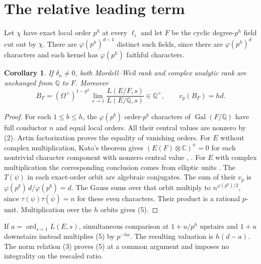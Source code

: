 \documentclass[11pt]{article}
\newtheorem{corollary}[theorem]{Corollary}
\newcommand{\Q}{\mathbb Q}
\newcommand{\ord}{\operatorname{ord}}
\begin{document}
\section{The relative leading term}
Let $\chi$ have exact local order $p^h$ at every $\ell_i$ and let $F$
be the cyclic degree-$p^h$ field cut out by $\chi$. There are
$\varphi(p^h)^{d-1}$ distinct such fields, since there are
$\varphi(p^h)^d$ characters and each kernel has $\varphi(p^h)$ faithful characters.
\begin{corollary}\label{relative}
If $\delta_n\ne0$, both Mordell--Weil rank and complex analytic rank
are unchanged from $\Q$ to $F$. Moreover
\[
 B_F=(\Omega^+)^{1-p^h}
 \lim_{s\to1}\frac{L(E/F,s)}{L(E/\Q,s)}
 \in\Q^\times,\qquad v_p(B_F)=hd .
 \tag{5}
\]
\end{corollary}
\begin{proof}
For each $1\le b\le h$, the $\varphi(p^b)$ order-$p^b$ characters of
$\operatorname{Gal}(F/\Q)$ have full conductor $n$ and equal local
orders. All their central values are nonzero by (2). Artin
factorization proves the equality of vanishing orders. For $E$ without
complex multiplication, Kato's theorem gives
$(E(F)\otimes\mathbb C)^\psi=0$ for each nontrivial character
component with nonzero central value
\cite[\S14]{Kato}, \cite[III, Thm.~5.4(ii)]{Rubin}.
For $E$ with complex multiplication the corresponding conclusion
comes from elliptic units \cite[III, Remark~5.7]{Rubin}.
The $T(\psi)$ in each exact-order orbit are algebraic conjugates.
The sum of their $v_p$ is $\varphi(p^b)\,d/\varphi(p^b)=d$.
The Gauss sums over that orbit multiply to $n^{\varphi(p^b)/2}$,
since $\tau(\psi)\tau(\overline\psi)=n$ for these even characters.
Their product is a rational $p$-unit. Multiplication over the $h$
orbits gives (5).
\end{proof}
If $a=\ord_{s=1}L(E,s)$, simultaneous comparison at $1+u/p^h$
upstairs and $1+u$ downstairs instead multiplies (5) by $p^{-ha}$.
The resulting valuation is $h(d-a)$. The norm relation (3) proves
(5) at a common argument and imposes no integrality on the rescaled
ratio.
\end{document}
